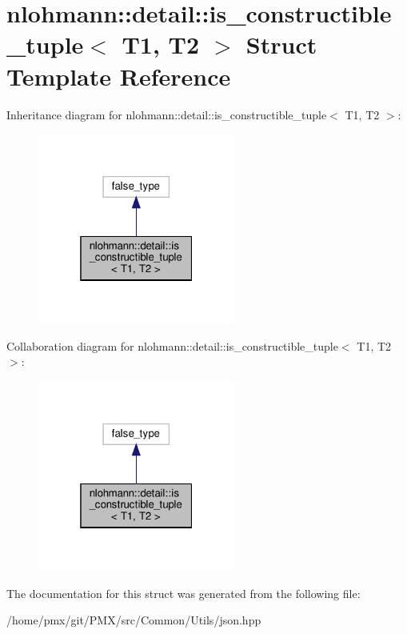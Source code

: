 \hypertarget{structnlohmann_1_1detail_1_1is__constructible__tuple}{}\section{nlohmann\+:\+:detail\+:\+:is\+\_\+constructible\+\_\+tuple$<$ T1, T2 $>$ Struct Template Reference}
\label{structnlohmann_1_1detail_1_1is__constructible__tuple}


Inheritance diagram for nlohmann\+:\+:detail\+:\+:is\+\_\+constructible\+\_\+tuple$<$ T1, T2 $>$\+:
\nopagebreak
\begin{figure}[H]
\begin{center}
\leavevmode
\includegraphics[width=184pt]{structnlohmann_1_1detail_1_1is__constructible__tuple__inherit__graph}
\end{center}
\end{figure}


Collaboration diagram for nlohmann\+:\+:detail\+:\+:is\+\_\+constructible\+\_\+tuple$<$ T1, T2 $>$\+:
\nopagebreak
\begin{figure}[H]
\begin{center}
\leavevmode
\includegraphics[width=184pt]{structnlohmann_1_1detail_1_1is__constructible__tuple__coll__graph}
\end{center}
\end{figure}


The documentation for this struct was generated from the following file\+:\begin{DoxyCompactItemize}
\item 
/home/pmx/git/\+P\+M\+X/src/\+Common/\+Utils/json.\+hpp\end{DoxyCompactItemize}
